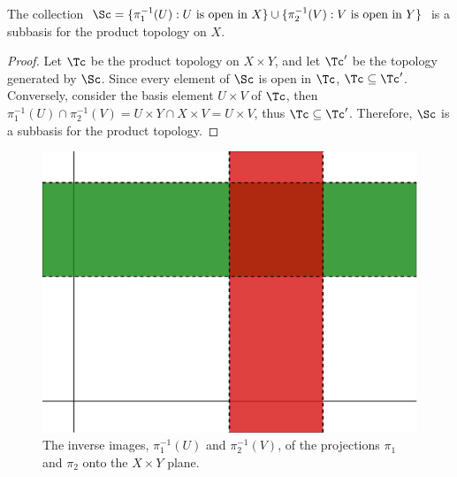 \begin{theorem}\label{1.4.3}
    The collection $\Sc=\{\pi_1^{-1}(U): U \text{ is open in } X\} \cup \{\pi_2^{-1}(V): V \text{ is open in } Y\}$
    is a subbasis for the product topology on $X$.
\end{theorem}
\begin{proof}
    Let $\Tc$ be the product topology on  $X \times Y$, and let  $\Tc'$ be the topology
    generated by $\Sc$. Since every element of  $\Sc$ is open in  $\Tc$,  $\Tc \subseteq \Tc'$. Conversely,
    consider the basis element  $U \times V$ of $\Tc$, then  $\pi_1^{-1}(U) \cap \pi_2^{-1}(V)=
    U \times Y \cap X \times V=U \times V$, thus $\Tc \subseteq \Tc'$. Therefore, $\Sc$ is a subbasis for the
    product topology.
\end{proof}

\begin{figure}[h]
    \centering
    \includegraphics[scale = 0.5]{Figures/Chapter1/inverse_projections.eps}
    \caption{The inverse images, $\pi_1^{-1}(U)$ and $\pi_2^{-1}(V)$, of the
    projections $\pi_1$ and $\pi_2$ onto the $X \times Y$ plane.}
    \label{fig1.5}
\end{figure}
